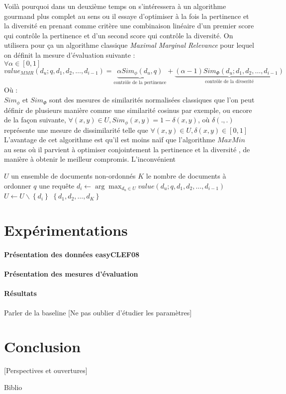 \documentclass{article}
\begin{document}
Voilà pourquoi dans un deuxième temps on s'intéressera à un algorithme gourmand plus complet au sens ou il essaye d'optimiser à la fois la pertinence et la diversité en prenant comme critère une combinaison linéaire d'un premier score qui contrôle la pertinence et d'un second score qui contrôle la diversité. On utilisera pour ça un algorithme classique \textit{Maximal Marginal Relevance} pour lequel on définit la mesure d'évaluation suivante : \\
$\forall \alpha \in [0,1]$
\begin{equation}
value_{MMR}(d_u;q,d_1,d_2,\dots,d_{i-1}) = \underbrace{\alpha Sim_{\phi}(d_u,q)}_{\text{contrôle de la pertinence}} + \underbrace{(\alpha - 1)Sim_{\Phi}(d_u;d_1,d_2,\dots,d_{i-1})}_{\text{contrôle de la divserité}}
\end{equation}
Où :\\
$Sim_{\phi}$ et $Sim_{\Phi}$ sont des mesures de similarités normalisées classiques que l'on peut définir de plusieurs manière comme une similarité cosinus par exemple, ou encore de la façon suivante, $\forall (x,y) \in U, Sim_{\phi}(x,y) = 1 - \delta(x,y) $, où $\delta(.,.)$ représente une mesure de dissimilarité telle que $\forall (x,y) \in U, \delta(x,y) \in [0,1]$
L'avantage de cet algorithme est qu'il est moins naïf  que l'algorithme $MaxMin$ au sens où il parvient à optimiser conjointement la pertinence et la diversité , de manière à obtenir le meilleur compromis. L'inconvénient 
\begin{algorithm}
\caption{$Maximal Marginal Relevance$}
\begin{algorithmic}
\REQUIRE $U$ un ensemble de documents non-ordonnés
\REQUIRE $K$ le nombre de documents à ordonner
\REQUIRE $q$ une requête
\STATE $d_i \leftarrow \arg\max_{d_u \in U} value(d_u;q,d_1,d_2,\dots,d_{i-1})$ 
\STATE $U \leftarrow U \backslash \left\{d_i\right\}$
\ENDFOR
\RETURN $\left\{d_1, d_2,\dots, d_K\right\}$
\end{algorithmic}
\end{algorithm}
\newpage
\section{Expérimentations}
\paragraph{Présentation des données easyCLEF08}

\paragraph{Présentation des mesures d'évaluation}

\paragraph{Résultats}
Parler de la baseline
[Ne pas oublier d'étudier les paramètres]

\section{Conclusion}
[Perspectives et ouvertures]

Biblio
\end{document}
